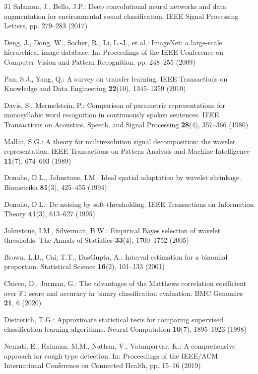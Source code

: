 \documentclass[pdflatex,sn-mathphys-num]{sn-jnl}
\begin{document}
\begin{thebibliography}{31}
Salamon, J., Bello, J.P.: Deep convolutional neural networks and data
augmentation for environmental sound classification. IEEE Signal Processing
Letters, pp. 279--283 (2017)

Deng, J., Dong, W., Socher, R., Li, L.-J., et al.: ImageNet: a large-scale
hierarchical image database. In: Proceedings of the IEEE Conference on
Computer Vision and Pattern Recognition, pp. 248--255 (2009)

Pan, S.J., Yang, Q.: A survey on transfer learning. IEEE Transactions on
Knowledge and Data Engineering \textbf{22}(10), 1345--1359 (2010)

Davis, S., Mermelstein, P.: Comparison of parametric representations for
monosyllabic word recognition in continuously spoken sentences. IEEE
Transactions on Acoustics, Speech, and Signal Processing \textbf{28}(4),
357--366 (1980)

Mallat, S.G.: A theory for multiresolution signal decomposition: the wavelet
representation. IEEE Transactions on Pattern Analysis and Machine Intelligence
\textbf{11}(7), 674--693 (1989)

Donoho, D.L., Johnstone, I.M.: Ideal spatial adaptation by wavelet shrinkage.
Biometrika \textbf{81}(3), 425--455 (1994)

Donoho, D.L.: De-noising by soft-thresholding. IEEE Transactions on
Information Theory \textbf{41}(3), 613--627 (1995)

Johnstone, I.M., Silverman, B.W.: Empirical Bayes selection of wavelet
thresholds. The Annals of Statistics \textbf{33}(4), 1700--1752 (2005)

Brown, L.D., Cai, T.T., DasGupta, A.: Interval estimation for a binomial
proportion. Statistical Science \textbf{16}(2), 101--133 (2001)

Chicco, D., Jurman, G.: The advantages of the Matthews correlation
coefficient over F1 score and accuracy in binary classification evaluation.
BMC Genomics \textbf{21}, 6 (2020)

Dietterich, T.G.: Approximate statistical tests for comparing supervised
classification learning algorithms. Neural Computation \textbf{10}(7),
1895--1923 (1998)

Nemati, E., Rahman, M.M., Nathan, V., Vatanparvar, K.: A comprehensive
approach for cough type detection. In: Proceedings of the IEEE/ACM
International Conference on Connected Health, pp. 15--16 (2019)


\end{thebibliography}
\end{document}
